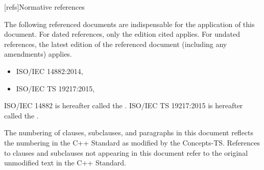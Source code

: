 
[refs]{Normative references}

\pnum
The following referenced documents are indispensable for the application of this
document. For dated references, only the edition cited applies. For undated
references, the latest edition of the referenced document (including any
amendments) applies.

\begin{itemize}
\item ISO/IEC 14882:2014, 
\item ISO/IEC TS 19217:2015, 
\end{itemize}

\pnum
ISO/IEC 14882 is hereafter called the . ISO/IEC TS 19217:2015 is hereafter called the .


\pnum
The numbering of clauses, subclauses, and paragraphs in this document reflects
the numbering in the C++ Standard as modified by the Concepts-TS.  References to clauses and subclauses not appearing in this document refer to the original unmodified text
in the C++ Standard.
